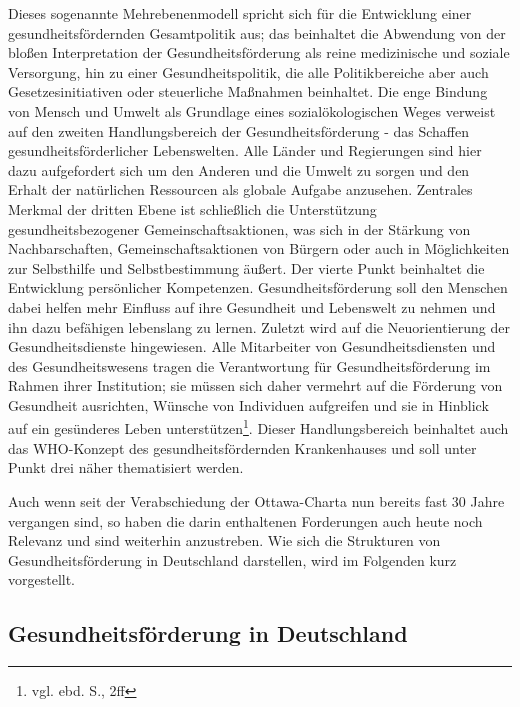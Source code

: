Dieses sogenannte Mehrebenenmodell spricht sich für die Entwicklung einer gesundheitsfördernden Gesamtpolitik aus; das beinhaltet die Abwendung von der bloßen Interpretation der Gesundheitsförderung als reine medizinische und soziale Versorgung, hin zu einer Gesundheitspolitik, die alle Politikbereiche aber auch Gesetzesinitiativen oder steuerliche Maßnahmen beinhaltet. Die enge Bindung von Mensch und Umwelt als Grundlage eines sozialökologischen Weges verweist auf den zweiten Handlungsbereich der Gesundheitsförderung - das Schaffen gesundheitsförderlicher Lebenswelten. Alle Länder und Regierungen sind hier dazu aufgefordert sich um den Anderen und die Umwelt zu sorgen und den Erhalt der natürlichen Ressourcen als globale Aufgabe anzusehen. Zentrales Merkmal der dritten Ebene ist schließlich die Unterstützung gesundheitsbezogener Gemeinschaftsaktionen, was sich in der Stärkung von Nachbarschaften, Gemeinschaftsaktionen von Bürgern oder auch in Möglichkeiten zur Selbsthilfe und Selbstbestimmung äußert. Der vierte Punkt beinhaltet die Entwicklung persönlicher Kompetenzen. Gesundheitsförderung soll den Menschen dabei helfen mehr Einfluss auf ihre Gesundheit und Lebenswelt zu nehmen und ihn dazu befähigen lebenslang zu lernen. Zuletzt wird auf die Neuorientierung der Gesundheitsdienste hingewiesen. Alle Mitarbeiter von Gesundheitsdiensten und des Gesundheitswesens tragen die Verantwortung für Gesundheitsförderung im Rahmen ihrer Institution; sie müssen sich daher vermehrt auf die Förderung von Gesundheit ausrichten, Wünsche von Individuen aufgreifen und sie in Hinblick auf ein gesünderes Leben unterstützen\footnote{vgl. ebd. S., 2ff}. Dieser Handlungsbereich beinhaltet auch das WHO-Konzept des gesundheitsfördernden Krankenhauses und soll unter Punkt drei näher thematisiert werden.

Auch wenn seit der Verabschiedung der Ottawa-Charta nun bereits fast 30 Jahre vergangen sind, so haben die darin enthaltenen Forderungen auch heute noch Relevanz und sind weiterhin anzustreben. Wie sich die Strukturen von Gesundheitsförderung in Deutschland darstellen, wird im Folgenden kurz vorgestellt.

\subsection{Gesundheitsförderung in Deutschland}
\label{sec:GesundheitsförderungInDeutschland}

